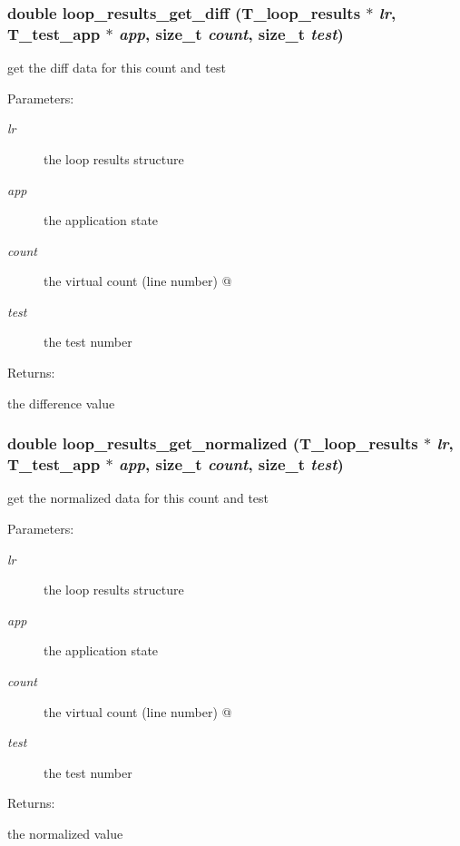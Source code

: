 \subsubsection{\setlength{\rightskip}{0pt plus 5cm}double loop\_\-results\_\-get\_\-diff ({\bf T\_\-loop\_\-results} $\ast$ {\em lr}, {\bf T\_\-test\_\-app} $\ast$ {\em app}, size\_\-t {\em count}, size\_\-t {\em test})}\label{group__loop__test_a12}


get the diff data for this count and test \begin{Desc}
\item[Parameters: ]\par
\begin{description}
\item[{\em 
lr}]the loop results structure \item[{\em 
app}]the application state \item[{\em 
count}]the virtual count (line number) @ \item[{\em 
test}]the test number \end{description}
\end{Desc}
\begin{Desc}
\item[Returns: ]\par
the difference value \end{Desc}
\subsubsection{\setlength{\rightskip}{0pt plus 5cm}double loop\_\-results\_\-get\_\-normalized ({\bf T\_\-loop\_\-results} $\ast$ {\em lr}, {\bf T\_\-test\_\-app} $\ast$ {\em app}, size\_\-t {\em count}, size\_\-t {\em test})}\label{group__loop__test_a13}


get the normalized data for this count and test \begin{Desc}
\item[Parameters: ]\par
\begin{description}
\item[{\em 
lr}]the loop results structure \item[{\em 
app}]the application state \item[{\em 
count}]the virtual count (line number) @ \item[{\em 
test}]the test number \end{description}
\end{Desc}
\begin{Desc}
\item[Returns: ]\par
the normalized value \end{Desc}
